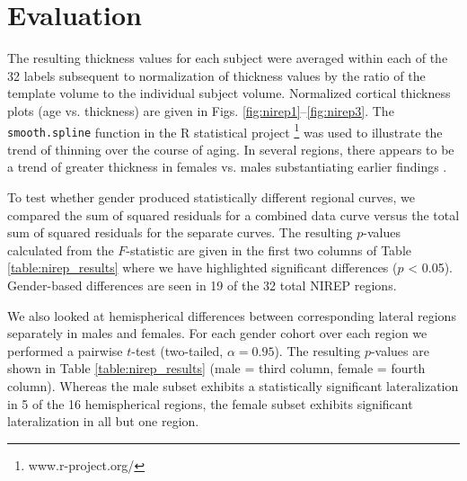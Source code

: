 \section{Evaluation}

The resulting thickness values for each subject were averaged within each
of the 32 labels subsequent to normalization of thickness values by the
ratio of the template volume to the individual subject volume.
Normalized cortical thickness plots (age vs. thickness) are given in Figs.
\ref{fig:nirep1}--\ref{fig:nirep3}.  The {\tt smooth.spline} function in the
R statistical project%
\footnote{
www.r-project.org/
}
was used to illustrate the trend of thinning over the course of aging. In 
several regions, there appears to be a trend of greater thickness in females
vs. males substantiating earlier findings \citep{luders2006a}. 

To test whether
gender produced statistically different regional curves, we compared 
the sum of squared residuals for a combined data curve versus the total sum of
squared residuals for the separate curves.  The resulting $p$-values calculated
from the $F$-statistic are given
in the first two columns of Table \ref{table:nirep_results} where we have 
highlighted significant differences ($p$ < 0.05).  Gender-based differences
are seen in 19 of the 32 total NIREP regions.

We also looked at hemispherical differences between corresponding lateral regions
separately in males and females.  For each gender cohort over each region we performed a pairwise $t$-test (two-tailed, $\alpha = 0.95$).  The resulting $p$-values are shown
in Table \ref{table:nirep_results} (male = third column, female = fourth column).  Whereas the male subset exhibits a statistically significant lateralization in
5 of the 16 hemispherical regions, the female subset exhibits significant lateralization
in all but one region.

\newcommand{\significant}[0]{\cellcolor[rgb]{1.0,1.0,0.8}}

